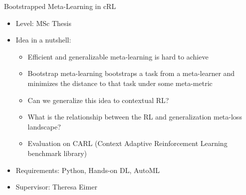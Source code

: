 \documentclass[aspectratio=169]{../latex_main/tntbeamer}  %
\begin{document}
\begin{frame}[c]{Bootstrapped Meta-Learning in cRL}
	
    \begin{itemize}
		\item Level: MSc Thesis
		\item Idea in a nutshell:
		\begin{itemize}
		    \item Efficient and generalizable meta-learning is hard to achieve
		    \item Bootstrap meta-learning bootstraps a task from a meta-learner and minimizes the distance to that task under some meta-metric
		    \item Can we generalize this idea to contextual RL?
		    \item What is the relationship between the RL and generalization meta-loss landscape?
		    \item Evaluation on CARL (Context Adaptive Reinforcement Learning benchmark library)
		\end{itemize}
		\item Requirements: Python, Hands-on DL, AutoML
		\item Supervisor: Theresa Eimer
	\end{itemize}
	
\end{frame}
	
	
\end{document}

